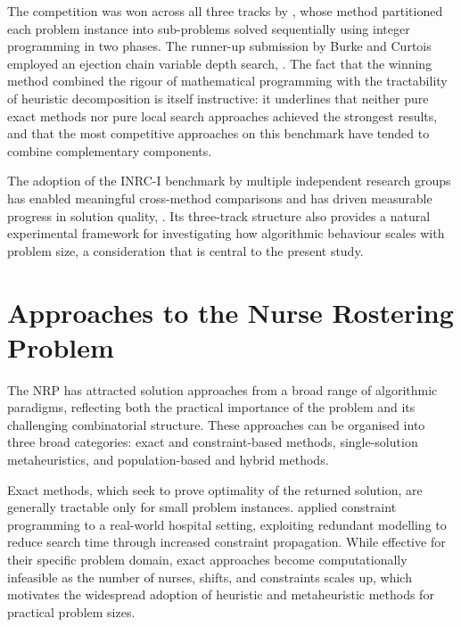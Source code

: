 \documentclass[12pt, a4paper, oneside]{report}
\begin{document}
The competition was won across all three tracks by
\citet{Valouxis2012}, whose method partitioned each problem instance
into sub-problems solved sequentially using integer programming in
two phases. The runner-up submission by Burke and Curtois employed an
ejection chain variable depth search, \citet{Haspeslagh2014}. The
fact that the winning method combined the rigour of mathematical
programming with the tractability of heuristic decomposition is
itself instructive: it underlines that neither pure exact methods nor
pure local search approaches achieved the strongest results, and that
the most competitive approaches on this benchmark have tended to
combine complementary components.

The adoption of the INRC-I benchmark by multiple independent research
groups has enabled meaningful cross-method comparisons and has driven
measurable progress in solution quality, \citet{Awadallah2015}. Its
three-track structure also provides a natural experimental framework
for investigating how algorithmic behaviour scales with problem size,
a consideration that is central to the present study.

\section{Approaches to the Nurse Rostering Problem}
\label{sec:approaches}

The NRP has attracted solution approaches from a broad range of
algorithmic paradigms, reflecting both the practical importance of
the problem and its challenging combinatorial structure. These
approaches can be organised into three broad categories: exact and
constraint-based methods, single-solution metaheuristics, and
population-based and hybrid methods.

Exact methods, which seek to prove optimality of the returned
solution, are generally tractable only for small problem instances.
\citet{Cheng1997} applied constraint programming to a real-world
hospital setting, exploiting redundant modelling to reduce search
time through increased constraint propagation. While effective for
their specific problem domain, exact approaches become
computationally infeasible as the number of nurses, shifts, and
constraints scales up, which motivates the widespread adoption of
heuristic and metaheuristic methods for practical problem sizes.
\end{document}
